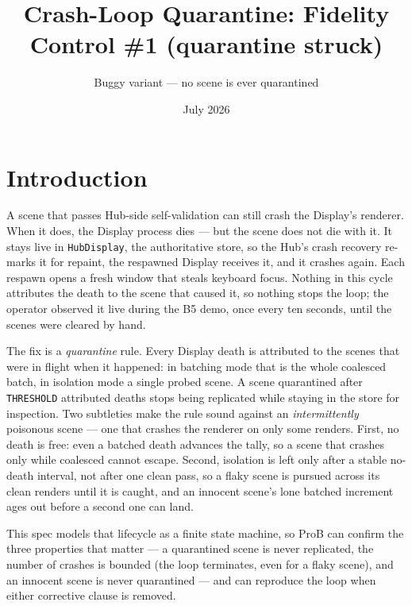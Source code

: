 \documentclass[a4paper,10pt,fleqn]{article}
\begin{document}
\title{Crash-Loop Quarantine: Fidelity Control \#1 (quarantine struck)}
\author{Buggy variant --- no scene is ever quarantined}
\date{July 2026}
\maketitle

\section{Introduction}

A scene that passes Hub-side self-validation can still crash the Display's
renderer.  When it does, the Display process dies --- but the scene does not
die with it.  It stays live in \texttt{HubDisplay}, the authoritative store, so
the Hub's crash recovery re-marks it for repaint, the respawned Display receives
it, and it crashes again.  Each respawn opens a fresh window that steals
keyboard focus.  Nothing in this cycle attributes the death to the scene that
caused it, so nothing stops the loop; the operator observed it live during the
B5 demo, once every ten seconds, until the scenes were cleared by hand.

The fix is a \emph{quarantine} rule.  Every Display death is attributed to the
scenes that were in flight when it happened: in batching mode that is the whole
coalesced batch, in isolation mode a single probed scene.  A scene quarantined
after \texttt{THRESHOLD} attributed deaths stops being replicated while staying
in the store for inspection.  Two subtleties make the rule sound against an
\emph{intermittently} poisonous scene --- one that crashes the renderer on only
some renders.  First, no death is free: even a batched death advances the tally,
so a scene that crashes only while coalesced cannot escape.  Second, isolation is
left only after a stable no-death interval, not after one clean pass, so a flaky
scene is pursued across its clean renders until it is caught, and an innocent
scene's lone batched increment ages out before a second one can land.

This spec models that lifecycle as a finite state machine, so ProB can confirm
the three properties that matter --- a quarantined scene is never replicated, the
number of crashes is bounded (the loop terminates, even for a flaky scene), and
an innocent scene is never quarantined --- and can reproduce the loop when either
corrective clause is removed.
\end{document}
